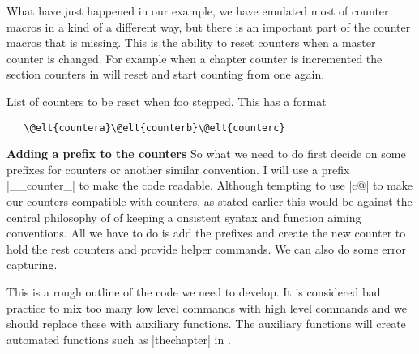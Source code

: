 What have just happened in our example, we have emulated most of \latexe counter macros in a kind of a different way, but there is an important part of the counter macros that is missing. This is the ability to reset counters when a master counter is changed. For example when a chapter counter is incremented the section counters in \latexe will reset and start counting from one again.



 List of counters to be reset when foo stepped. This has a  format
\begin{verbatim}
   \@elt{countera}\@elt{counterb}\@elt{counterc}
\end{verbatim}

\textbf{Adding a prefix to the counters} So what we need to do first decide on some prefixes for counters or another similar convention. I will use a prefix |__counter_| to make the code readable. Although tempting to use |c@|  to make our counters compatible with \latexe counters, as stated earlier this would be against the central philosophy of  of keeping a onsistent syntax and function aiming conventions. All we have to do is add the prefixes and create the new counter to hold the rest counters and provide helper commands. We can also do some error capturing. 


    
This is a rough outline of the code we need to develop. It is considered bad practice to mix too many low level commands with high level commands and we should replace these with auxiliary functions. The auxiliary functions will create automated functions such as |thechapter| in \latexe.


